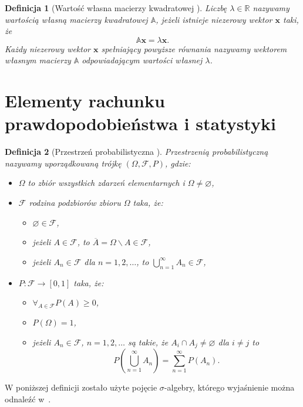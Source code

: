 \documentclass[12pt,a4paper]{report}
\newtheorem{df}{Definicja}[chapter]
\newcommand{\setR}{\mathbb{R}}
\begin{document}
\begin{df}[Wartość własna macierzy kwadratowej {\citep[Sec 12.2]{alzega}}]
Liczbę $\lambda \in \setR$ nazywamy wartością własną macierzy kwadratowej $\mathbb{A}$, jeżeli istnieje niezerowy wektor $\mathbf{x}$ taki, że
$$
\mathbb{A}\mathbf{x}=\lambda\mathbf{x}.
$$
Każdy niezerowy wektor $\mathbf{x}$ spełniający powyższe równania nazywamy wektorem własnym macierzy $\mathbb{A}$ odpowiadającym wartości własnej $\lambda$.
\end{df}


\section{Elementy rachunku prawdopodobieństwa i statystyki}

\begin{df}[Przestrzeń probabilistyczna {\citep[Sec 1.2, Sec 1.4]{wztp}}]
Przestrzenią probabilistyczną nazywamy uporządkowaną trójkę $(\Omega, \mathcal{F}, P)$, gdzie:
\begin{itemize}
\item $\Omega$ to zbiór wszystkich zdarzeń elementarnych i $\Omega \neq \varnothing$,
\item $ \mathcal{F} $ rodzina podzbiorów zbioru $\Omega$ taka, że:
\begin{itemize}
\item $\varnothing \in \mathcal{F} $,
\item jeżeli $ \mathit{A} \in \mathcal{F}$, to $\overline{\mathit{A}} = \Omega \backslash \mathit{A} \in \mathcal{F}$,
\item jeżeli $ \mathit{A}_n \in \mathcal{F}$ dla $n=1,2,\ldots$, to $\bigcup_{n=1}^{\infty} \mathit{A}_n \in \mathcal{F}$,
\end{itemize}
\item $P : \mathcal{F} \to [0,1]$ taka, że:
\begin{itemize}
\item $\forall_{\mathit{A} \in \mathcal{F}} P(\mathit{A}) \geq 0$,
\item $P(\Omega) = 1$,
\item jeżeli $ \mathit{A}_n \in \mathcal{F}$, $n=1,2,\ldots$ są takie, że $\mathit{A}_i \cap \mathit{A}_j \neq \varnothing$ dla $i \neq j$ to
$$
P(\bigcup_{n=1}^{\infty} \mathit{A}_n) = \sum_{n=1}^{\infty} P(\mathit{A}_n).
$$
\end{itemize}
\end{itemize}
\end{df}

W poniższej definicji zostało użyte pojęcie $\sigma$-algebry, którego wyjaśnienie można odnaleźć w~{\citep[Sec 1.2 Def. 1.2]{wztp}}.
\end{document}
